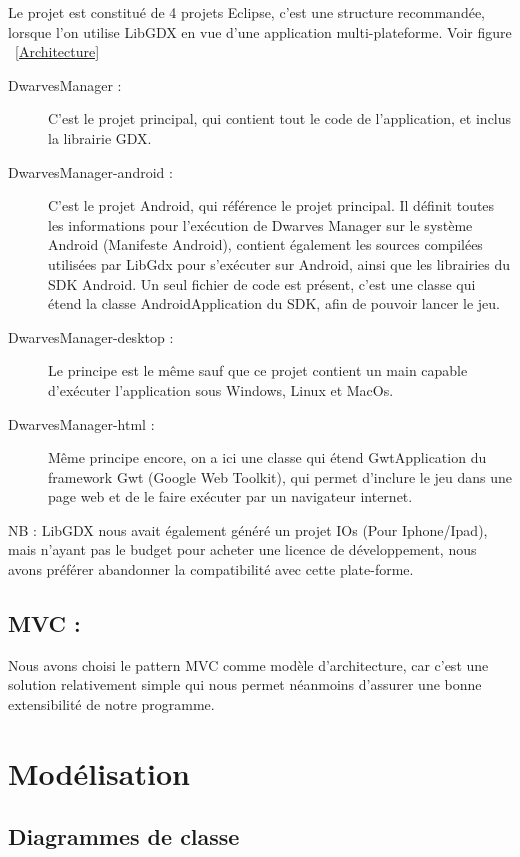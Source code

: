 \documentclass[a4paper]{report}
\begin{document}
Le projet est constitué de 4 projets Eclipse, c'est une structure recommandée, lorsque l'on utilise LibGDX en 	vue  d'une application multi-plateforme. Voir figure ~\ref{Architecture}

\begin{description}
\item[DwarvesManager :]C'est le projet principal, qui contient tout le code de l'application, et inclus la librairie GDX.
\item[DwarvesManager-android :]C'est le projet Android, qui référence le projet principal. Il définit toutes les informations pour l’exécution de Dwarves Manager sur le système Android (Manifeste Android), contient également les sources compilées utilisées par LibGdx pour s’exécuter sur Android, ainsi que les librairies du SDK Android. Un seul fichier de code est présent, c'est une classe qui étend la classe AndroidApplication du SDK, afin de pouvoir lancer le jeu.
\item[DwarvesManager-desktop :] Le principe est le même sauf que ce projet contient un main capable d'exécuter l'application sous Windows, Linux et MacOs.
\item[DwarvesManager-html :]Même principe encore, on a ici une classe qui étend GwtApplication du framework Gwt (Google Web Toolkit), qui permet d'inclure le jeu dans une page web et de le faire exécuter par un navigateur internet.
\end{description}

NB : LibGDX nous avait également généré un projet IOs (Pour Iphone/Ipad), mais n'ayant pas le budget pour acheter une licence de développement, nous avons préférer abandonner la compatibilité avec cette plate-forme.

\section*{MVC :}

Nous avons choisi le pattern MVC comme modèle d'architecture, car c'est une solution relativement simple qui nous permet néanmoins d'assurer une bonne extensibilité de notre programme.

\newpage

\chapter*{Modélisation}

\section*{Diagrammes de classe}
\end{document}
